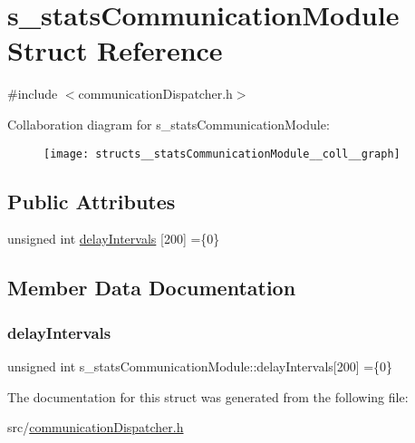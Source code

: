 \hypertarget{structs__statsCommunicationModule}{}\section{s\+\_\+stats\+Communication\+Module Struct Reference}
\label{structs__statsCommunicationModule}


{\ttfamily \#include $<$communication\+Dispatcher.\+h$>$}



Collaboration diagram for s\+\_\+stats\+Communication\+Module\+:\nopagebreak
\begin{figure}[H]
\begin{center}
\leavevmode
\texttt{[image: structs\_\_statsCommunicationModule\_\_coll\_\_graph]}
\end{center}
\end{figure}
\subsection*{Public Attributes}
\begin{DoxyCompactItemize}
\item 
unsigned int \hyperlink{structs__statsCommunicationModule_a19c4cf28c1e3cd24e80398bbf5be89d6}{delay\+Intervals} \mbox{[}200\mbox{]} =\{0\}
\end{DoxyCompactItemize}


\subsection{Member Data Documentation}
\mbox{\label{structs__statsCommunicationModule_a19c4cf28c1e3cd24e80398bbf5be89d6}} 
\subsubsection{\texorpdfstring{delay\+Intervals}{delayIntervals}}
{\footnotesize\ttfamily unsigned int s\+\_\+stats\+Communication\+Module\+::delay\+Intervals\mbox{[}200\mbox{]} =\{0\}}



The documentation for this struct was generated from the following file\+:\begin{DoxyCompactItemize}
\item 
src/\hyperlink{communicationDispatcher_8h}{communication\+Dispatcher.\+h}\end{DoxyCompactItemize}
